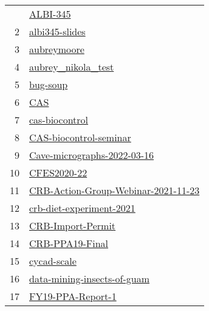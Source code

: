 \begin{longtable}{rl}
	\bottomrule
	\endlastfoot
	1 &                                                       \href{https://github.com/aubreymoore/ALBI-345}{ALBI-345} \\
	2 &                                           \href{https://github.com/aubreymoore/albi345-slides}{albi345-slides} \\
	3 &                                                 \href{https://github.com/aubreymoore/aubreymoore}{aubreymoore} \\
	4 &                                   \href{https://github.com/aubreymoore/aubrey_nikola_test}{aubrey\_nikola\_test} \\
	5 &                                                       \href{https://github.com/aubreymoore/bug-soup}{bug-soup} \\
	6 &                                                                 \href{https://github.com/aubreymoore/CAS}{CAS} \\
	7 &                                           \href{https://github.com/aubreymoore/cas-biocontrol}{cas-biocontrol} \\
	8 &                           \href{https://github.com/aubreymoore/CAS-biocontrol-seminar}{CAS-biocontrol-seminar} \\
	9 &                 \href{https://github.com/aubreymoore/Cave-micrographs-2022-03-16}{Cave-micrographs-2022-03-16} \\
	10 &                                                 \href{https://github.com/aubreymoore/CFES2020-22}{CFES2020-22} \\
	11 & \href{https://github.com/aubreymoore/CRB-Action-Group-Webinar-2021-11-23}{CRB-Action-Group-Webinar-2021-11-23} \\
	12 &                       \href{https://github.com/aubreymoore/crb-diet-experiment-2021}{crb-diet-experiment-2021} \\
	13 &                                     \href{https://github.com/aubreymoore/CRB-Import-Permit}{CRB-Import-Permit} \\
	14 &                                         \href{https://github.com/aubreymoore/CRB-PPA19-Final}{CRB-PPA19-Final} \\
	15 &                                                 \href{https://github.com/aubreymoore/cycad-scale}{cycad-scale} \\
	16 &                 \href{https://github.com/aubreymoore/data-mining-insects-of-guam}{data-mining-insects-of-guam} \\
	17 &                                     \href{https://github.com/aubreymoore/FY19-PPA-Report-1}{FY19-PPA-Report-1} \\

\end{longtable}
